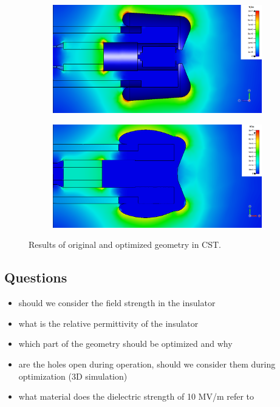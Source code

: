 \begin{center}
\begin{figure}[H]
   \begin{subfigure}{0.45\textwidth}
      \includegraphics[width=\textwidth]{figures/200kV/cst/efield_orig}
   \end{subfigure}
   \begin{subfigure}{0.45\textwidth}
      \includegraphics[width=\textwidth]{figures/200kV/cst/efield_insulator_new}
   \end{subfigure}
   \caption{Results of original and optimized geometry in CST.}
\end{figure}
\end{center}

\subsection{Questions}
\begin{itemize}
   \item should we consider the field strength in the insulator
   \item what is the relative permittivity of the insulator
   \item which part of the geometry should be optimized and why
   \item are the holes open during operation, should we consider them during optimization (3D simulation)
   \item what material does the dielectric strength of 10 MV/m refer to
\end{itemize}


